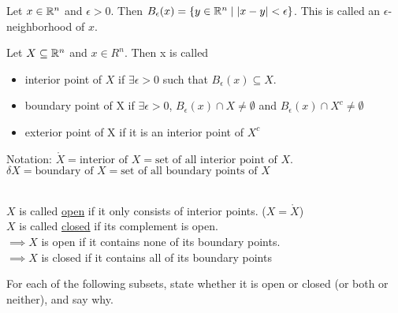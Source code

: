 

\begin{defn}
  Let $x\in \mathbb{R}^n$ and $\epsilon > 0$. Then $B_\epsilon (x) = \left\{ y\in \mathbb{R}^n \mid |x-y|<\epsilon \right\}$. This is called an $\epsilon$-neighborhood of $x$.
\end{defn}
\begin{defn}
  Let $X\subseteq \mathbb{R}^n$ and $x\in R^n$. Then x is called
  \begin{itemize}
    \item interior point of $X$ if $\exists \epsilon > 0$ such that $B_\epsilon (x) \subseteq X$.
    \item boundary point of X if $\exists \epsilon > 0$, $B_\epsilon (x) \cap X \neq \emptyset$ and $B_\epsilon (x) \cap X^c \neq \emptyset$
    \item exterior point of X if it is an interior point of $X^c$
  \end{itemize}
  Notation: $\mathring{X} = \text{interior of }X = \text{set of all interior point of }X$.
  $\delta X = \text{boundary of }X = \text{set of all boundary points of }X$
\end{defn}
\begin{defn}
  \\
  $X$ is called \ul{open} if it only consists of interior points. ($X=\mathring{X}$) \\
  $X$ is called \ul{closed} if its complement is open. \\
  $\implies X$ is open if it contains none of its boundary points. \\
  $\implies X$ is closed if it contains all of its boundary points \\
\end{defn}

For each of the following subsets, state whether it is open or closed (or both or neither), and say why.

